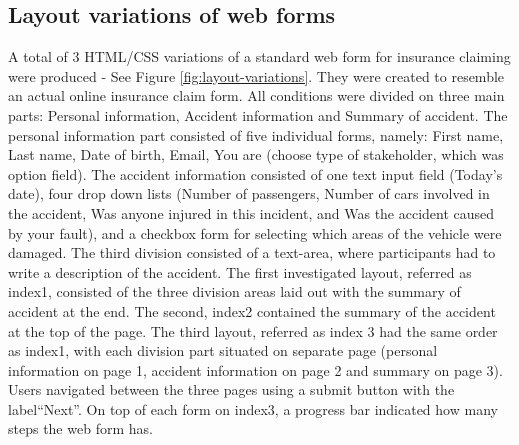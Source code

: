\documentclass[../main/Feedback.tex]{subfiles}
\begin{document}
\subsection{Layout variations of web forms}
A total of 3 HTML/CSS variations of a standard web form for insurance claiming were produced - See Figure \ref{fig:layout-variations}.
They were created to resemble an actual online insurance claim form. 
All conditions were divided on three main parts: Personal information, Accident information and Summary of accident. 
The personal information part consisted of five individual forms, namely: First name, Last name, Date of birth, Email, You are (choose type of stakeholder, which was option field). 
The accident information consisted of one text input field (Today's date), four drop down lists (Number of passengers, Number of cars involved in the accident, Was anyone injured in this incident, and Was the accident caused by your fault), and a checkbox form for selecting which areas of the vehicle were damaged.
The third division consisted of a text-area, where participants had to write a description of the accident.
The first investigated layout, referred as index1, consisted of the three division areas laid out with the summary of accident at the end.
The second, index2 contained the summary of the accident at the top of the page.
The third layout, referred as index 3 had the same order as index1, with each division part situated on separate page (personal information on page 1, accident information on page 2 and summary on page 3).
Users navigated between the three pages using a submit button with the label``Next''.
On top of each form on index3, a progress bar indicated how many steps the web form has.
\end{document}
